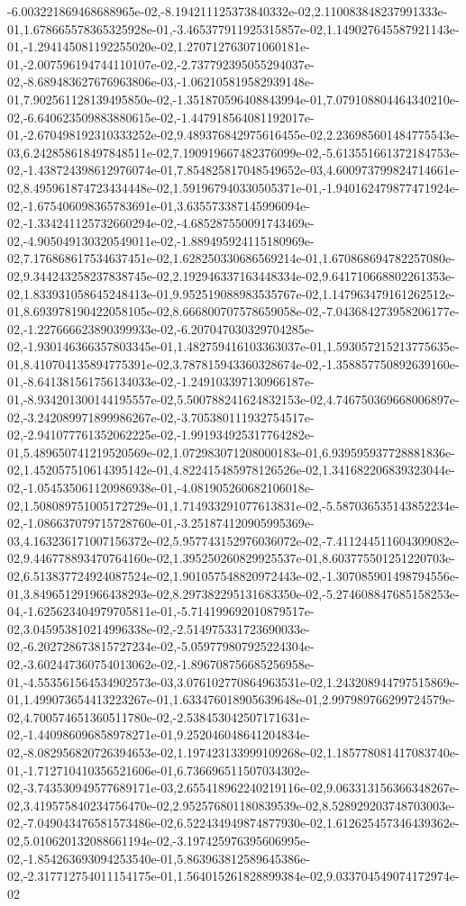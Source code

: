 -6.003221869468688965e-02,-8.194211125373840332e-02,2.110083848237991333e-01,1.678665578365325928e-01,-3.465377911925315857e-02,1.149027645587921143e-01,-1.294145081192255020e-02,1.270712763071060181e-01,-2.007596194744110107e-02,-2.737792395055294037e-02,-8.689483627676963806e-03,-1.062105819582939148e-01,7.902561128139495850e-02,-1.351870596408843994e-01,7.079108804464340210e-02,-6.640623509883880615e-02,-1.447918564081192017e-01,-2.670498192310333252e-02,9.489376842975616455e-02,2.236985601484775543e-03,6.242858618497848511e-02,7.190919667482376099e-02,-5.613551661372184753e-02,-1.438724398612976074e-01,7.854825817048549652e-03,4.600973799824714661e-02,8.495961874723434448e-02,1.591967940330505371e-01,-1.940162479877471924e-02,-1.675406098365783691e-01,3.635573387145996094e-02,-1.334241125732660294e-02,-4.685287550091743469e-02,-4.905049130320549011e-02,-1.889495924115180969e-02,7.176868617534637451e-02,1.628250330686569214e-01,1.670868694782257080e-02,9.344243258237838745e-02,2.192946337163448334e-02,9.641710668802261353e-02,1.833931058645248413e-01,9.952519088983535767e-02,1.147963479161262512e-01,8.693978190422058105e-02,8.666800707578659058e-02,-7.043684273958206177e-02,-1.227666623890399933e-02,-6.207047030329704285e-02,-1.930146366357803345e-01,1.482759416103363037e-01,1.593057215213775635e-01,8.410704135894775391e-02,3.787815943360328674e-02,-1.358857750892639160e-01,-8.641381561756134033e-02,-1.249103397130966187e-01,-8.934201300144195557e-02,5.500788241624832153e-02,4.746750369668006897e-02,-3.242089971899986267e-02,-3.705380111932754517e-02,-2.941077761352062225e-02,-1.991934925317764282e-01,5.489650741219520569e-02,1.072983071208000183e-01,6.939595937728881836e-02,1.452057510614395142e-01,4.822415485978126526e-02,1.341682206839323044e-02,-1.054535061120986938e-01,-4.081905260682106018e-02,1.508089751005172729e-01,1.714933291077613831e-02,-5.587036535143852234e-02,-1.086637079715728760e-01,-3.251874120905995369e-03,4.163236171007156372e-02,5.957743152976036072e-02,-7.411244511604309082e-02,9.446778893470764160e-02,1.395250260829925537e-01,8.603775501251220703e-02,6.513837724924087524e-02,1.901057548820972443e-02,-1.307085901498794556e-01,3.849651291966438293e-02,8.297382295131683350e-02,-5.274608847685158253e-04,-1.625623404979705811e-01,-5.714199692010879517e-02,3.045953810214996338e-02,-2.514975331723690033e-02,-6.202728673815727234e-02,-5.059779807925224304e-02,-3.602447360754013062e-02,-1.896708756685256958e-01,-4.553561564534902573e-03,3.076102770864963531e-02,1.243208944797515869e-01,1.499073654413223267e-01,1.633476018905639648e-01,2.997989766299724579e-02,4.700574651360511780e-02,-2.538453042507171631e-02,-1.440986096858978271e-01,9.252046048641204834e-02,-8.082956820726394653e-02,1.197423133999109268e-02,1.185778081417083740e-01,-1.712710410356521606e-01,6.736696511507034302e-02,-3.743530949577689171e-03,2.655418962240219116e-02,9.063313156366348267e-02,3.419575840234756470e-02,2.952576801180839539e-02,8.528929203748703003e-02,-7.049043476581573486e-02,6.522434949874877930e-02,1.612625457346439362e-02,5.010620132088661194e-02,-3.197425976395606995e-02,-1.854263693094253540e-01,5.863963812589645386e-02,-2.317712754011154175e-01,1.564015261828899384e-02,9.033704549074172974e-02
